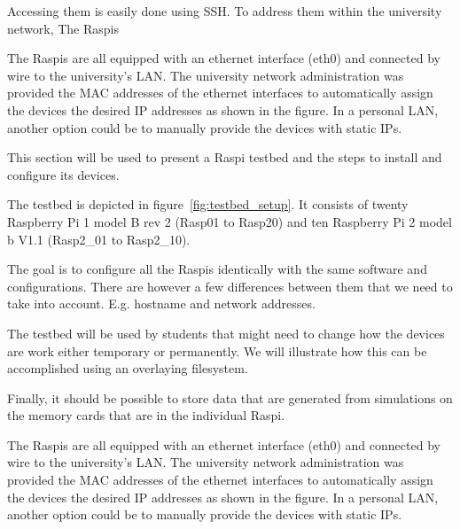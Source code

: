 Accessing them is easily done using \ac{SSH}.
To address them within the university network,
The \ac{Raspi}s

The \ac{Raspi}s are all equipped with an ethernet interface (eth0) and
connected by wire to the university's \ac{LAN}. The university network
administration was provided
the \ac{MAC} addresses of the ethernet interfaces to automatically assign
the devices the desired \ac{IP} addresses as shown in the figure. In a personal
\ac{LAN}, another option could be to manually provide the devices with static
\ac{IP}s.


This section will be used to present a \ac{Raspi} testbed and the steps to
install and configure its devices.

The testbed is depicted in figure~\ref{fig:testbed_setup}. It consists of twenty
Raspberry Pi 1 model B rev 2 (Rasp01 to Rasp20) and
ten Raspberry Pi 2 model b V1.1 (Rasp2\_01 to Rasp2\_10).

The goal is to configure all the \ac{Raspi}s identically with the same software
and configurations. There are however a few differences between them that we
need to take into account. E.g. hostname and network addresses.

The testbed will be used by students that might need to change how the
devices are work either temporary or permanently. We will illustrate how this
can be accomplished using an overlaying filesystem.

Finally, it should be possible to store data that are generated from
simulations on the memory cards that are in the individual \ac{Raspi}.



The \ac{Raspi}s are all equipped with an ethernet interface (eth0) and
connected by wire to the university's \ac{LAN}. The university network
administration was provided
the \ac{MAC} addresses of the ethernet interfaces to automatically assign
the devices the desired \ac{IP} addresses as shown in the figure. In a personal
\ac{LAN}, another option could be to manually provide the devices with static
\ac{IP}s.


